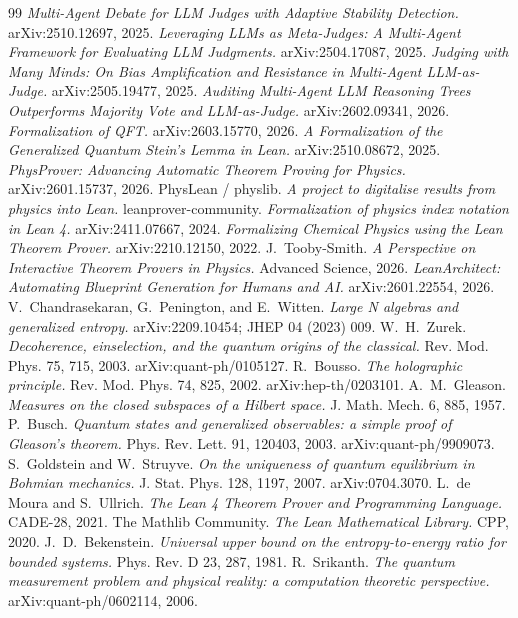 \documentclass[11pt]{article}
\begin{document}
\begin{thebibliography}{99}
 \emph{Multi-Agent Debate for LLM Judges with Adaptive Stability Detection.} arXiv:2510.12697, 2025.
 \emph{Leveraging LLMs as Meta-Judges: A Multi-Agent Framework for Evaluating LLM Judgments.} arXiv:2504.17087, 2025.
 \emph{Judging with Many Minds: On Bias Amplification and Resistance in Multi-Agent LLM-as-Judge.} arXiv:2505.19477, 2025.
 \emph{Auditing Multi-Agent LLM Reasoning Trees Outperforms Majority Vote and LLM-as-Judge.} arXiv:2602.09341, 2026.
 \emph{Formalization of QFT.} arXiv:2603.15770, 2026.
 \emph{A Formalization of the Generalized Quantum Stein's Lemma in Lean.} arXiv:2510.08672, 2025.
 \emph{PhysProver: Advancing Automatic Theorem Proving for Physics.} arXiv:2601.15737, 2026.
 PhysLean / physlib. \emph{A project to digitalise results from physics into Lean.} leanprover-community.
 \emph{Formalization of physics index notation in Lean 4.} arXiv:2411.07667, 2024.
 \emph{Formalizing Chemical Physics using the Lean Theorem Prover.} arXiv:2210.12150, 2022.
 J.~Tooby-Smith. \emph{A Perspective on Interactive Theorem Provers in Physics.} Advanced Science, 2026.
 \emph{LeanArchitect: Automating Blueprint Generation for Humans and AI.} arXiv:2601.22554, 2026.
 V.~Chandrasekaran, G.~Penington, and E.~Witten. \emph{Large N algebras and generalized entropy.} arXiv:2209.10454; JHEP 04 (2023) 009.
 W.~H.~Zurek. \emph{Decoherence, einselection, and the quantum origins of the classical.} Rev. Mod. Phys. 75, 715, 2003. arXiv:quant-ph/0105127.
 R.~Bousso. \emph{The holographic principle.} Rev. Mod. Phys. 74, 825, 2002. arXiv:hep-th/0203101.
 A.~M.~Gleason. \emph{Measures on the closed subspaces of a Hilbert space.} J. Math. Mech. 6, 885, 1957.
 P.~Busch. \emph{Quantum states and generalized observables: a simple proof of Gleason's theorem.} Phys. Rev. Lett. 91, 120403, 2003. arXiv:quant-ph/9909073.
 S.~Goldstein and W.~Struyve. \emph{On the uniqueness of quantum equilibrium in Bohmian mechanics.} J. Stat. Phys. 128, 1197, 2007. arXiv:0704.3070.
 L.~de Moura and S.~Ullrich. \emph{The Lean 4 Theorem Prover and Programming Language.} CADE-28, 2021.
 The Mathlib Community. \emph{The Lean Mathematical Library.} CPP, 2020.
 J.~D.~Bekenstein. \emph{Universal upper bound on the entropy-to-energy ratio for bounded systems.} Phys. Rev. D 23, 287, 1981.
 R.~Srikanth. \emph{The quantum measurement problem and physical reality: a computation theoretic perspective.} arXiv:quant-ph/0602114, 2006.

\end{thebibliography}
\end{document}
